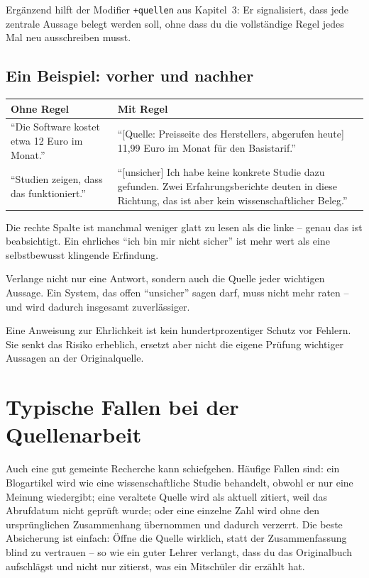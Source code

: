Ergänzend hilft der Modifier \texttt{+quellen} aus Kapitel~3: Er signalisiert, dass jede zentrale Aussage belegt werden soll, ohne dass du die vollständige Regel jedes Mal neu ausschreiben musst.

\subsection{Ein Beispiel: vorher und nachher}

\begin{tabularx}{\textwidth}{@{}p{}X@{}}\toprule
\textbf{Ohne Regel}&\textbf{Mit Regel}\\\midrule
``Die Software kostet etwa 12 Euro im Monat.''&``[Quelle: Preisseite des Herstellers, abgerufen heute] 11,99 Euro im Monat für den Basistarif.''\\
``Studien zeigen, dass das funktioniert.''&``[unsicher] Ich habe keine konkrete Studie dazu gefunden. Zwei Erfahrungsberichte deuten in diese Richtung, das ist aber kein wissenschaftlicher Beleg.''\\\bottomrule
\end{tabularx}

Die rechte Spalte ist manchmal weniger glatt zu lesen als die linke -- genau das ist beabsichtigt. Ein ehrliches ``ich bin mir nicht sicher'' ist mehr wert als eine selbstbewusst klingende Erfindung.

\begin{merke}
Verlange nicht nur eine Antwort, sondern auch die Quelle jeder wichtigen Aussage. Ein System, das offen ``unsicher'' sagen darf, muss nicht mehr raten -- und wird dadurch insgesamt zuverlässiger.
\end{merke}

\begin{achtung}
Eine Anweisung zur Ehrlichkeit ist kein hundertprozentiger Schutz vor Fehlern. Sie senkt das Risiko erheblich, ersetzt aber nicht die eigene Prüfung wichtiger Aussagen an der Originalquelle.
\end{achtung}

\section{Typische Fallen bei der Quellenarbeit}

Auch eine gut gemeinte Recherche kann schiefgehen. Häufige Fallen sind: ein Blogartikel wird wie eine wissenschaftliche Studie behandelt, obwohl er nur eine Meinung wiedergibt; eine veraltete Quelle wird als aktuell zitiert, weil das Abrufdatum nicht geprüft wurde; oder eine einzelne Zahl wird ohne den ursprünglichen Zusammenhang übernommen und dadurch verzerrt. Die beste Absicherung ist einfach: Öffne die Quelle wirklich, statt der Zusammenfassung blind zu vertrauen -- so wie ein guter Lehrer verlangt, dass du das Originalbuch aufschlägst und nicht nur zitierst, was ein Mitschüler dir erzählt hat.

